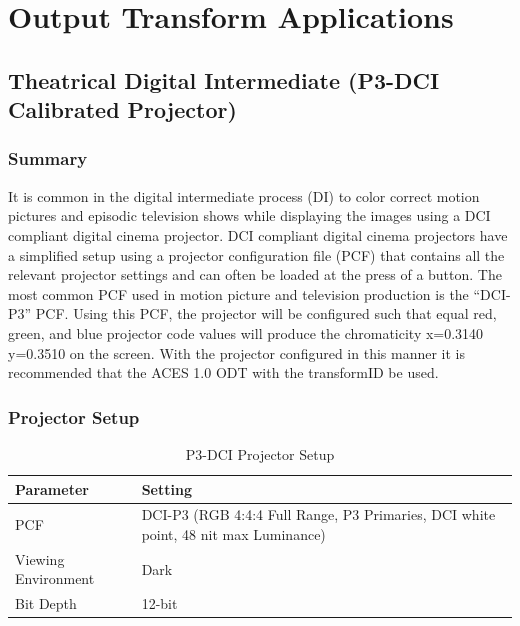 \numberedformat

\clearpage
\chapter{Output Transform Applications}\label{ch:ot-app}


\section{Theatrical Digital Intermediate (P3-DCI Calibrated Projector)}
\label{sec:ot-app-p3dci}

\subsection{Summary}
\label{subsec:summary-p3dci}

It is common in the digital intermediate process (DI) to color correct
motion pictures and episodic television shows while displaying the
images using a DCI compliant digital cinema projector. DCI compliant
digital cinema projectors have a simplified setup using a projector
configuration file (PCF) that contains all the relevant projector
settings and can often be loaded at the press of a button. The most
common PCF used in motion picture and television production is the
``DCI-P3'' PCF. Using this PCF, the projector will be configured such
that equal red, green, and blue projector code values will produce the
chromaticity x=0.3140 y=0.3510 on the screen. With the projector
configured in this manner it is recommended that the ACES 1.0 ODT with
the transformID \texttt{} be used.

\subsection{Projector Setup}
\label{subsec:setup-p3dci}

\begin{table}[ht!]
    \centering
        \begin{tabular}{|p{1.25in}|p{3in}|}
            \hline
            \textbf{Parameter} & \textbf{Setting} \\ \hline
            PCF & DCI-P3 (RGB 4:4:4 Full Range, P3 Primaries, DCI white point, 48 nit max Luminance) \\ \hline
            Viewing Environment & Dark \\ \hline
            Bit Depth & 12-bit \\ \hline 
    \end{tabular}
    \caption[Theatrical DI (P3DCI) - Projector Setup]{\small P3-DCI Projector Setup} 
    \label{tab:setup-p3dci}
\end{table}

